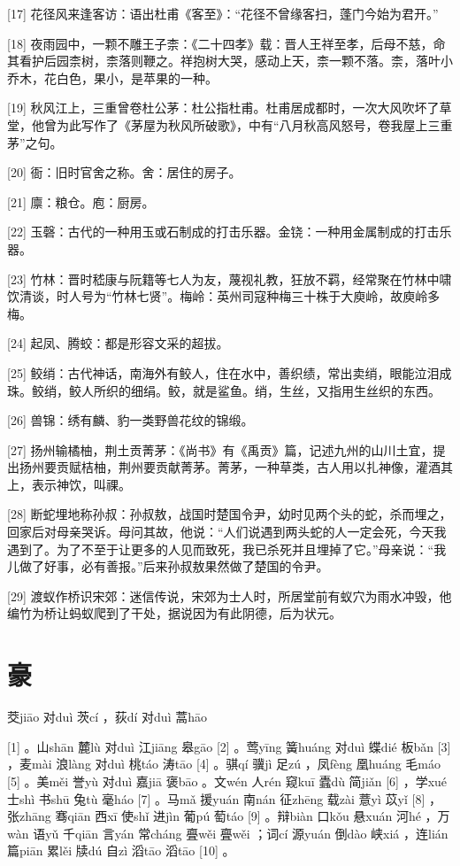 \documentclass[12pt,UTF8]{ctexbook}
\begin{document}
[17] 花径风来逢客访：语出杜甫《客至》：“花径不曾缘客扫，蓬门今始为君开。”

[18] 夜雨园中，一颗不雕王子柰：《二十四孝》载：晋人王祥至孝，后母不慈，命其看护后园柰树，柰落则鞭之。祥抱树大哭，感动上天，柰一颗不落。柰，落叶小乔木，花白色，果小，是苹果的一种。

[19] 秋风江上，三重曾卷杜公茅：杜公指杜甫。杜甫居成都时，一次大风吹坏了草堂，他曾为此写作了《茅屋为秋风所破歌》，中有“八月秋高风怒号，卷我屋上三重茅”之句。

[20] 衙：旧时官舍之称。舍：居住的房子。

[21] 廪：粮仓。庖：厨房。

[22] 玉磬：古代的一种用玉或石制成的打击乐器。金铙：一种用金属制成的打击乐器。

[23] 竹林：晋时嵇康与阮籍等七人为友，蔑视礼教，狂放不羁，经常聚在竹林中啸饮清谈，时人号为“竹林七贤”。梅岭：英州司寇种梅三十株于大庾岭，故庾岭多梅。

[24] 起凤、腾蛟：都是形容文采的超拔。

[25] 鲛绡：古代神话，南海外有鲛人，住在水中，善织绩，常出卖绡，眼能泣泪成珠。鲛绡，鲛人所织的细绢。鲛，就是鲨鱼。绡，生丝，又指用生丝织的东西。

[26] 兽锦：绣有麟、豹一类野兽花纹的锦缎。

[27] 扬州输橘柚，荆土贡菁茅：《尚书》有《禹贡》篇，记述九州的山川土宜，提出扬州要贡赋桔柚，荆州要贡献菁茅。菁茅，一种草类，古人用以扎神像，灌酒其上，表示神饮，叫祼。

[28] 断蛇埋地称孙叔：孙叔敖，战国时楚国令尹，幼时见两个头的蛇，杀而埋之，回家后对母亲哭诉。母问其故，他说：“人们说遇到两头蛇的人一定会死，今天我遇到了。为了不至于让更多的人见而致死，我已杀死并且埋掉了它。”母亲说：“我儿做了好事，必有善报。”后来孙叔敖果然做了楚国的令尹。

[29] 渡蚁作桥识宋郊：迷信传说，宋郊为士人时，所居堂前有蚁穴为雨水冲毁，他编竹为桥让蚂蚁爬到了干处，据说因为有此阴德，后为状元。





\chapter{豪}


茭jiāo 对duì 茨cí ，荻dí 对duì 蒿hāo





[1] 。山shān 麓lù 对duì 江jiāng 皋gāo [2] 。莺yīng 簧huáng 对duì 蝶dié 板bǎn [3] ，麦mài 浪làng 对duì 桃táo 涛tāo [4] 。骐qí 骥jì 足zú ，凤fèng 凰huáng 毛máo [5] 。美měi 誉yù 对duì 嘉jiā 褒bāo 。文wén 人rén 窥kuī 蠹dù 简jiǎn [6] ，学xué 士shì 书shū 兔tù 毫háo [7] 。马mǎ 援yuán 南nán 征zhēng 载zài 薏yì 苡yǐ [8] ，张zhāng 骞qiān 西xī 使shǐ 进jìn 葡pú 萄táo [9] 。辩biàn 口kǒu 悬xuán 河hé ，万wàn 语yǔ 千qiān 言yán 常cháng 亹wěi 亹wěi ；词cí 源yuán 倒dào 峡xiá ，连lián 篇piān 累lěi 牍dú 自zì 滔tāo 滔tāo [10] 。
\end{document}
